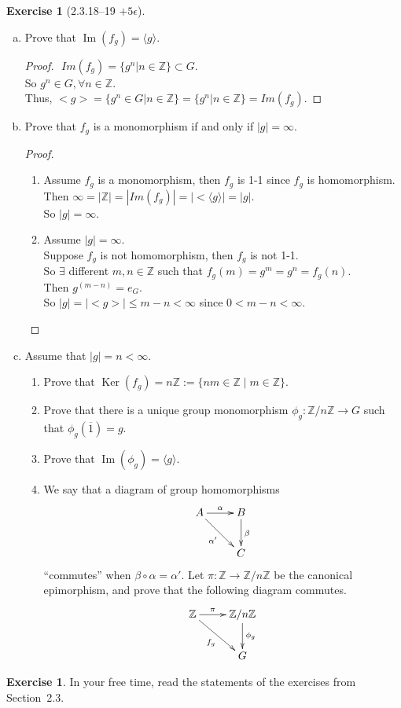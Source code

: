 \documentclass{amsart}
\newcommand{\bbz}{\mathbb{Z}}
\renewcommand{\ker}{\operatorname{Ker}}
\newcommand{\im}{\operatorname{Im}}
\theoremstyle{plain}
\theoremstyle{definition}
\newtheorem{exer}[lem]{Exercise}
\begin{document}
\begin{exer}[2.3.18--19 $+5\epsilon$]
\begin{enumerate}[(a)]
\item Prove that $\im(f_g)=\langle g\rangle$.
	\begin{proof}
		$ $\newline
		$Im(f_g) = \{g^n | n \in \bbz\} \subset G$.\\
		So $g^n \in G, \forall n \in \bbz$.\\
		Thus, $<g> = \{g^n \in G | n \in \bbz\} = \{g^n | n \in \bbz\} = Im(f_g)$.
	\end{proof}
\item Prove that $f_g$ is a monomorphism if and only if $|g|=\infty$.
	\begin{proof}
		$ $\newline
		\begin{enumerate}
			\item
				Assume $f_g$ is a monomorphism, then $f_g$ is 1-1 since $f_g$ is homomorphism.\\
				Then $\infty= |\bbz| = |Im(f_g)| = |<\langle g \rangle| = |g|$.\\
				So $|g| = \infty$.
			\item 
				Assume $|g| = \infty$.\\
				Suppose $f_g$ is not homomorphism, then $f_g$ is not 1-1.\\
				So $\exists$ different $m,n \in \bbz$ such that $f_g(m) = g^m = g^n= f_g(n)$.\\
				Then $g^(m-n) = e_G$.\\
				So $|g| = |<g>| \leq m-n < \infty$ since $0< m-n < \infty$.\\
	
		\end{enumerate}


	\end{proof}

\item Assume that $|g|=n<\infty$.
\begin{enumerate}[(1)]
\item Prove that $\ker(f_g)=n\bbz:=\{nm\in\bbz\mid m\in\bbz\}$.
\item Prove that 
there is a unique group monomorphism $\phi_g\colon\bbz/n\bbz\to G$ such that $\phi_g(\overline 1)=g$. 
\item Prove that $\im(\phi_g)=\langle g\rangle$.
\item We say that a diagram 
of group homomorphisms
$$\xymatrix{A\ar[r]^-\alpha\ar[rd]_{\alpha'}&B\ar[d]^\beta \\ & C}$$
``commutes'' when $\beta\circ\alpha=\alpha'$.
Let $\pi\colon \bbz\to\bbz/n\bbz$ be the canonical epimorphism, and prove that the following diagram commutes.
$$\xymatrix{\bbz\ar[r]^-{\pi}\ar[rd]_{f_g}&\bbz/n\bbz\ar[d]^{\phi_g} \\ & G}$$
\end{enumerate}
\end{enumerate}
\end{exer}


\begin{exer}
In your free time, read the statements of the  exercises from Section~2.3.
\end{exer}
\end{document}
